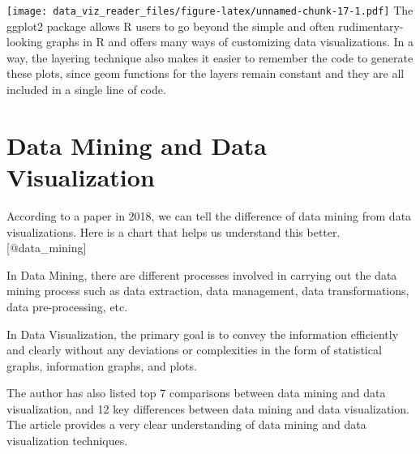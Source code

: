 \documentclass[]{book}
\theoremstyle{definition}
\theoremstyle{definition}
\theoremstyle{definition}
\theoremstyle{remark}
\begin{document}
\texttt{[image: data\_viz\_reader\_files/figure-latex/unnamed-chunk-17-1.pdf]}
The ggplot2 package allows R users to go beyond the simple and often
rudimentary-looking graphs in R and offers many ways of customizing data
visualizations. In a way, the layering technique also makes it easier to
remember the code to generate these plots, since geom functions for the
layers remain constant and they are all included in a single line of
code.

\section{Data Mining and Data
Visualization}\label{data-mining-and-data-visualization}

According to a paper in 2018, we can tell the difference of data mining
from data visualizations. Here is a chart that helps us understand this
better. {[}@data\_mining{]}

In Data Mining, there are different processes involved in carrying out
the data mining process such as data extraction, data management, data
transformations, data pre-processing, etc.

In Data Visualization, the primary goal is to convey the information
efficiently and clearly without any deviations or complexities in the
form of statistical graphs, information graphs, and plots.

The author has also listed top 7 comparisons between data mining and
data visualization, and 12 key differences between data mining and data
visualization. The article provides a very clear understanding of data
mining and data visualization techniques.
\end{document}

